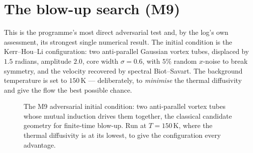 \section{The blow-up search (M9)}
\label{sec:blowup-search}

This is the programme's most direct adversarial test and, by the 
log's own assessment, its strongest single numerical result. The initial
condition is the Kerr--Hou--Li configuration: two anti-parallel Gaussian
vortex tubes, displaced by \(1.5\) radians, amplitude \(2.0\), core width
\(\sigma=0.6\), with \(5\%\) random \(x\)-noise to break symmetry, and the
velocity recovered by spectral Biot--Savart. The background temperature is set
to \(150\,\mathrm{K}\) --- deliberately, to \emph{minimise} the thermal
diffusivity and give the flow the best possible chance.

\begin{figure}[ht]
\centering
{}
\caption[The M9 adversarial initial condition]{The M9 adversarial initial
condition: two anti-parallel vortex tubes whose mutual induction drives them
together, the classical candidate geometry for finite-time blow-up. Run at
\(T=150\,\mathrm{K}\), where the thermal diffusivity is at its lowest, to give
the configuration every advantage.}
\label{fig:m9-ic}
\end{figure}

